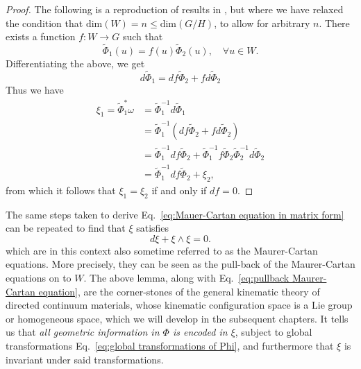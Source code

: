 \begin{proof}
The following is a reproduction of results in \citep{clellandFrenetCartanMethod2017}, but where we have relaxed the condition that $\text{dim}(W) = n \leq \text{dim}(G/H)$, to allow for arbitrary $n$. There exists a function $f : W \to G$ such that
\begin{equation}
\tilde{\Phi}_1(u) =  f(u) \tilde{\Phi}_2(u), \quad \forall u\in W.
\end{equation}
Differentiating the above, we get
\begin{equation}
d\tilde{\Phi}_1 = df \tilde{\Phi}_2 + f d \tilde{\Phi}_2
\end{equation}
Thus we have
\begin{equation}
\begin{aligned}
\xi_1 = \tilde{\Phi}_1^* \omega & = \tilde{\Phi}_1^{-1} d \tilde{\Phi}_1 \\
& = \tilde{\Phi}_1^{-1} ( df \tilde{\Phi}_2 + f d \tilde{\Phi}_2 ) \\
& = \tilde{\Phi}_1^{-1} df \tilde{\Phi}_2  + \tilde{\Phi}_1^{-1} f \tilde{\Phi}_2 \tilde{\Phi}_2^{-1}  d \tilde{\Phi}_2 \\
& = \tilde{\Phi}_1^{-1} df \tilde{\Phi}_2  + \xi_2,
\end{aligned}
\end{equation}
from which it follows that $\xi_1 = \xi_2$ if and only if $df = 0$.
\end{proof}

The same steps taken to derive Eq.~\ref{eq:Mauer-Cartan equation in matrix form} can be repeated to find that $\xi$ satisfies
\begin{equation} \label{eq:pullback Maurer-Cartan equation}
d \xi + \xi \wedge \xi = 0.
\end{equation}
which are in this context also sometime referred to as the Maurer-Cartan equations. More precisely, they can be seen as the pull-back of the Maurer-Cartan equations on to $W$. The above lemma, along with Eq.~\ref{eq:pullback Maurer-Cartan equation}, are the corner-stones of the general kinematic theory of directed continuum materials, whose kinematic configuration space is a Lie group or homogeneous space, which we will develop in the subsequent chapters. It tells us that \textit{all geometric information in $\Phi$ is encoded in $\xi$}, subject to global transformations Eq.~\ref{eq:global transformations of Phi}, and furthermore that $\xi$ is invariant under said transformations.

